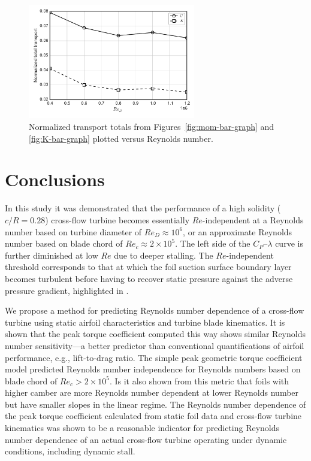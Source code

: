 \documentclass[energies,article,accept,moreauthors,pdftex,12pt,a4paper]{mdpi}
\begin{document}
\begin{figure}[ht!]
\centering
\includegraphics[width=0.65\textwidth]{figures/wake_trans_totals}
\caption{Normalized transport totals from Figures~\ref{fig:mom-bar-graph} and
\ref{fig:K-bar-graph} plotted versus Reynolds number.}
\label{fig:wake-trans-totals}
\end{figure}


\section{Conclusions}

In this study it was demonstrated that the performance of a high solidity
($c/R=0.28$) cross-flow turbine becomes essentially $Re$-independent at a
Reynolds number based on turbine diameter of $Re_D \approx 10^6$, or an
approximate Reynolds number based on blade chord of $Re_c \approx 2 \times
10^5$. The left side of the $C_P$--$\lambda$ curve is further diminished at low
$Re$ due to deeper stalling. The $Re$-independent threshold corresponds to that
at which the foil suction surface boundary layer becomes turbulent before having
to recover static pressure against the adverse pressure gradient, highlighted in
\cite{Lissaman1983, McMasters1980, Carmichael1981}.

We propose a method for predicting Reynolds number dependence of a cross-flow
turbine using static airfoil characteristics and turbine blade kinematics. It is
shown that the peak torque coefficient computed this way shows similar Reynolds
number sensitivity---a better predictor than conventional quantifications of
airfoil performance, e.g., lift-to-drag ratio. The simple peak geometric torque
coefficient model predicted Reynolds number independence for Reynolds numbers
based on blade chord of $Re_c > 2 \times 10^5$. Is it also shown from this
metric that foils with higher camber are more Reynolds number dependent at 
lower Reynolds number but have
smaller slopes in the linear regime. The Reynolds number dependence of the peak
torque coefficient calculated from static foil data and cross-flow turbine
kinematics was shown to be a reasonable indicator for predicting Reynolds number
dependence of an actual cross-flow turbine operating under dynamic conditions,
including dynamic stall.
\end{document}
